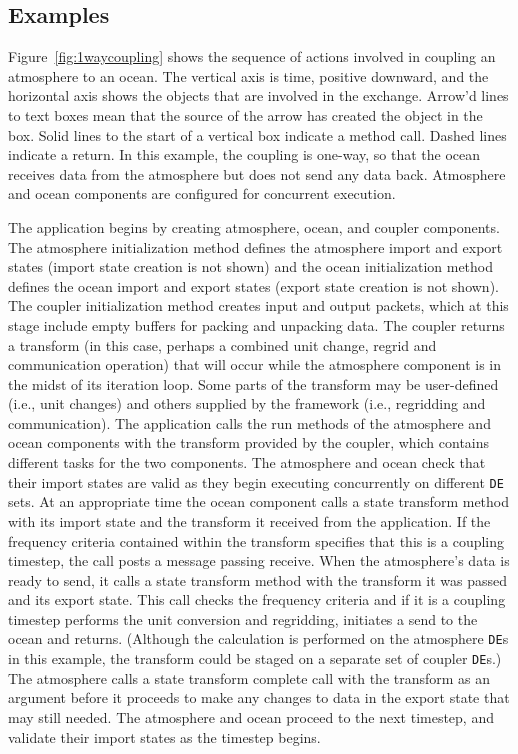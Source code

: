 \subsection{Examples}

Figure~\ref{fig:1waycoupling} shows the sequence of actions involved
in coupling an atmosphere to an ocean.  The vertical axis is time, positive
downward, and the horizontal axis shows the objects that are involved in the
exchange.  Arrow'd lines to text boxes mean that the source of the arrow has 
created the object in the box.  Solid lines to the start of a vertical
box indicate a method call.  Dashed lines indicate a return.  
In this example, the coupling is one-way, so that the ocean 
receives data from the atmosphere but does not send any data back.  Atmosphere
and ocean components are configured for concurrent execution.

The application begins by creating atmosphere, ocean, and coupler components.
The atmosphere initialization method defines the atmosphere import and export states
(import state creation is not shown) and the ocean initialization method defines
the ocean import and export states (export state creation is not shown).  The
coupler initialization method creates input and output packets, which at this
stage include empty buffers for packing and unpacking data.  The coupler returns a
transform (in this case, perhaps a combined unit change, regrid and communication 
operation) that will occur while the atmosphere 
component is in the midst of its iteration loop.  Some parts of the transform
may be user-defined (i.e., unit changes) and others supplied by the framework
(i.e., regridding and communication).  The application calls the run methods
of the atmosphere and ocean components with the transform provided by the coupler,
which contains different tasks for the two components.  The atmosphere and ocean 
check that their import states are valid as they begin executing concurrently on
different {\tt DE} sets.  At an appropriate time the
ocean component calls a state transform method with its import state and 
the transform it received from the application.  If the frequency criteria
contained within the transform specifies that this is a coupling timestep,
the call 
posts a message passing receive.  When the atmosphere's data is ready to send, 
it calls a state transform method with the transform it was passed and 
its export state.  This call checks the frequency criteria and if it is a 
coupling timestep performs
the unit conversion and regridding, initiates a send
to the ocean and returns.  (Although the calculation is performed on the atmosphere 
{\tt DE}s in this example, the transform could be staged on a separate set of coupler
{\tt DE}s.)  The atmosphere calls a state transform complete call with the transform
as an argument before it proceeds to make any changes to data in the export state
that may still needed.  The atmosphere and ocean proceed to the next 
timestep, and validate their import states as the timestep begins.  

